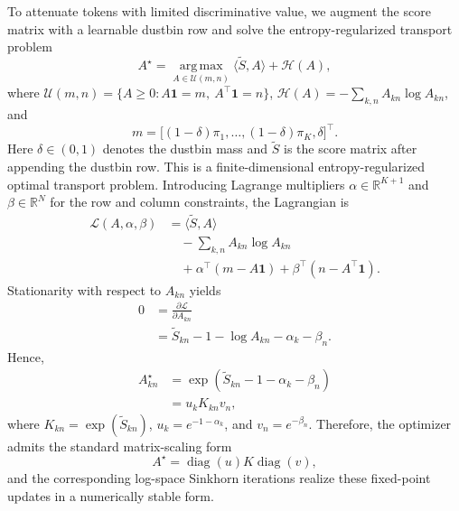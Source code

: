 \documentclass[journal]{IEEEtran}
\begin{document}
To attenuate tokens with limited discriminative value, we augment the score matrix with a learnable dustbin row and solve the entropy-regularized transport problem
\[
A^\star = \operatorname*{arg\,max}_{A \in \mathcal{U}(m,n)} \langle \tilde{S}, A \rangle + \mathcal{H}(A),
\]
where \(\mathcal{U}(m,n) = \{A \ge 0 : A\mathbf{1} = m,\ A^\top\mathbf{1} = n\}\), \(\mathcal{H}(A) = -\sum_{k,n} A_{kn}\log A_{kn}\), and
\[
m = \big[(1-\delta)\pi_1,\ldots,(1-\delta)\pi_K,\delta\big]^\top.
\]
Here \(\delta \in (0,1)\) denotes the dustbin mass and \(\tilde{S}\) is the score matrix after appending the dustbin row. This is a finite-dimensional entropy-regularized optimal transport problem. Introducing Lagrange multipliers \(\alpha \in \mathbb{R}^{K+1}\) and \(\beta \in \mathbb{R}^{N}\) for the row and column constraints, the Lagrangian is
\begin{align}
\mathcal{L}(A,\alpha,\beta)
&= \langle \tilde{S},A\rangle \nonumber\\
&\quad - \sum_{k,n}A_{kn}\log A_{kn} \nonumber\\
&\quad + \alpha^\top(m-A\mathbf{1}) + \beta^\top(n-A^\top\mathbf{1}).
\end{align}
Stationarity with respect to \(A_{kn}\) yields
\begin{align}
0 &= \frac{\partial \mathcal{L}}{\partial A_{kn}} \nonumber\\
  &= \tilde{S}_{kn} - 1 - \log A_{kn} - \alpha_k - \beta_n.
\end{align}
Hence,
\begin{align}
A^\star_{kn}
&= \exp(\tilde{S}_{kn} - 1 - \alpha_k - \beta_n) \nonumber\\
&= u_k K_{kn} v_n,
\end{align}
where \(K_{kn} = \exp(\tilde{S}_{kn})\), \(u_k = e^{-1-\alpha_k}\), and \(v_n = e^{-\beta_n}\). Therefore, the optimizer admits the standard matrix-scaling form
\[
A^\star = \operatorname{diag}(u)K\operatorname{diag}(v),
\]
and the corresponding log-space Sinkhorn iterations realize these fixed-point updates in a numerically stable form.
\end{document}
